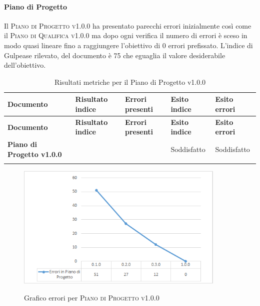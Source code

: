 \documentclass[../piano-di-qualifica.tex]{subfiles}
\begin{document}
\paragraph{Piano di Progetto}
\label{sub:piano_di_progetto}
Il \textsc{Piano di Progetto v1.0.0} ha presentato parecchi errori inizialmente così come il \textsc{Piano di Qualifica v1.0.0} ma dopo ogni verifica il numero di errori è sceso in modo quasi lineare fino a raggiungere l'obiettivo di 0 errori prefissato.
L'indice di Gulpease rilevato, del documento è 75 che eguaglia il valore desiderabile dell'obiettivo.

\renewcommand{\arraystretch}{2} %
\begin{longtable}[H]{>{\centering\bfseries}m{6cm} >{\centering}m{2cm} >{\centering}m{2.5cm} >{\centering}m{2.5cm} >{\centering\arraybackslash}m{2.5cm}}  
  \rowcolor{lightgray}
  {\textbf{Documento}} & {\textbf{Risultato indice}} & {\textbf{Errori presenti}} & {\textbf{Esito indice}} & {\textbf{Esito errori}}  \\
  \endfirsthead%
  \rowcolor{lightgray}
  {\textbf{Documento}} & {\textbf{Risultato indice}} & {\textbf{Errori presenti}} & {\textbf{Esito indice}} & {\textbf{Esito errori}}  \\
  \endhead%
  \textbf{Piano di Progetto v1.0.0} & 75                 & 0               & Soddisfatto & Soddisfatto \\
  \caption{Risultati metriche per il Piano di Progetto v1.0.0}
  \label{tab:my-table}
\end{longtable}

\begin{figure}[H]
    \centering
    \includegraphics[width=10cm]{img/erroriPdP.png}
    \label{fig:scice_documenti}
    \caption{Grafico errori per \textsc{Piano di Progetto v1.0.0}}
\end{figure}
\end{document}
